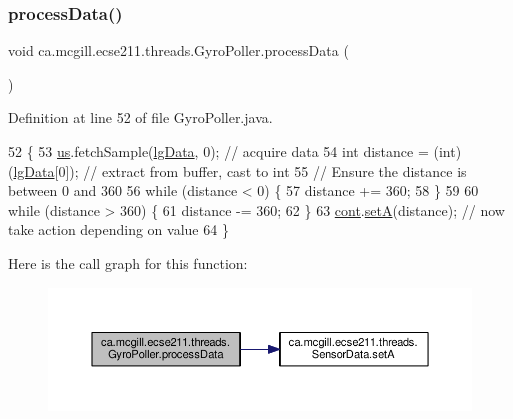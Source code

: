 \subsubsection{\texorpdfstring{process\+Data()}{processData()}}
{\footnotesize\ttfamily void ca.\+mcgill.\+ecse211.\+threads.\+Gyro\+Poller.\+process\+Data (\begin{DoxyParamCaption}{ }\end{DoxyParamCaption})\hspace{0.3cm}{\ttfamily [protected]}}



Definition at line 52 of file Gyro\+Poller.\+java.


\begin{DoxyCode}
52                                \{
53     \hyperlink{classca_1_1mcgill_1_1ecse211_1_1threads_1_1_gyro_poller_af478329ec7a335a4f3d2d412d5d10091}{us}.fetchSample(\hyperlink{classca_1_1mcgill_1_1ecse211_1_1threads_1_1_gyro_poller_a112e433b3561e89927357051f55f8cf1}{lgData}, 0); \textcolor{comment}{// acquire data}
54     \textcolor{keywordtype}{int} distance = (int) (\hyperlink{classca_1_1mcgill_1_1ecse211_1_1threads_1_1_gyro_poller_a112e433b3561e89927357051f55f8cf1}{lgData}[0]); \textcolor{comment}{// extract from buffer, cast to int}
55     \textcolor{comment}{// Ensure the distance is between 0 and 360}
56     \textcolor{keywordflow}{while} (distance < 0) \{
57       distance += 360;
58     \}
59 
60     \textcolor{keywordflow}{while} (distance > 360) \{
61       distance -= 360;
62     \}
63     \hyperlink{classca_1_1mcgill_1_1ecse211_1_1threads_1_1_gyro_poller_a90507a3d6038ff7ec7881640b5dd4263}{cont}.\hyperlink{classca_1_1mcgill_1_1ecse211_1_1threads_1_1_sensor_data_a35b1941d44e86b81eb7c625efbd3c8ba}{setA}(distance); \textcolor{comment}{// now take action depending on value}
64   \}
\end{DoxyCode}
Here is the call graph for this function\+:\nopagebreak
\begin{figure}[H]
\begin{center}
\leavevmode
\includegraphics[width=350pt]{classca_1_1mcgill_1_1ecse211_1_1threads_1_1_gyro_poller_a27f914ed77f23805210998fc0ee2daa7_cgraph}
\end{center}
\end{figure}
